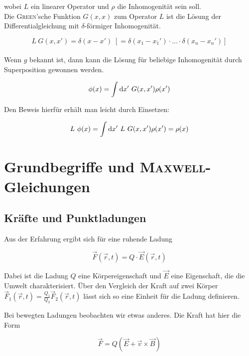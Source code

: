 wobei $L$ ein linearer Operator und $\rho$ die Inhomogenität sein soll.\
\\
Die \textsc{Green}'sche Funktion $G(x,x)$ zum Operator $L$ ist die Lösung der Differentialgleichung mit $\delta$-förmiger Inhomogenität.

\begin{equation*}
L \ G(x,x') = \delta (x-x') \; [= \delta(x_1-x_1')\cdot\dotsc\cdot\delta(x_n - x_n')]
\end{equation*}
\ \\
Wenn $g$ bekannt ist, dann kann die Lösung für beliebige Inhomogenität durch Superposition gewonnen werden.

\begin{equation*}
\phi (x) = \int\mathrm{d} x' \ G(x,x') \rho(x')
\end{equation*}

Den Beweis hierfür erhält man leicht durch Einsetzen:

\begin{equation*}
L \ \phi(x) = \int\mathrm{d} x' \ L \ G(x,x') \rho(x') = \rho(x)
\end{equation*}


\chapter{Grundbegriffe und \textsc{Maxwell}-Gleichungen}
\section{Kräfte und Punktladungen}

Aus der Erfahrung ergibt sich für eine ruhende Ladung

\begin{equation*}
\vec{F}(\vec{r},t)=Q\cdot\vec{E}(\vec{r},t)
\end{equation*}

Dabei ist die Ladung $Q$ eine Körpereigenschaft und $\vec{E}$ eine Eigenschaft, die die Umwelt charakterisiert. Über den Vergleich der Kraft auf zwei Körper $\vec{F}_1(\vec{r},t)=\frac{Q_1}{Q_2}\vec{F}_2(\vec{r},t)$ lässt sich so eine Einheit für die Ladung definieren.\\
\linebreak

Bei bewegten Ladungen beobachten wir etwas anderes. Die Kraft hat hier die Form

\begin{equation*}
\vec{F}=Q(\vec{E}+\vec{v}\times\vec{B})
\end{equation*}

